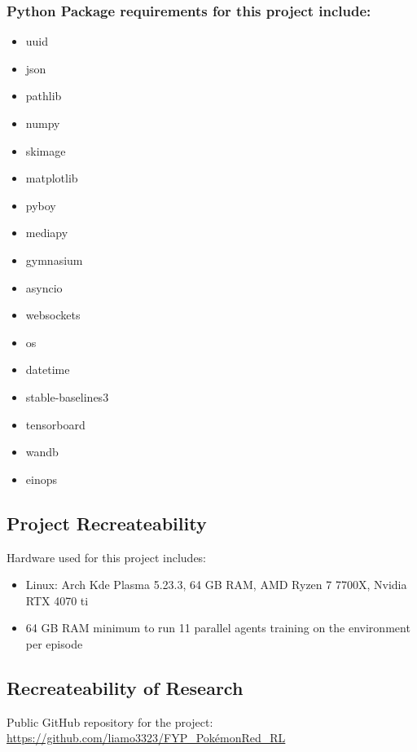 \subsubsection*{Python Package requirements for this project include: }

\begin{multicols}{2}
\begin{itemize}
    \item uuid
    \item json
    \item pathlib
    \item numpy
    \item skimage
    \item matplotlib
    \item pyboy
    \item mediapy
    \item gymnasium
    \item asyncio
    \item websockets
    \item os
    \item datetime
    \item stable-baselines3
    \item tensorboard
    \item wandb
    \item einops
\end{itemize}
\end{multicols}

\subsection{Project Recreateability}\label{subsec:Hardware}

Hardware used for this project includes:
\begin{itemize}
    \item Linux: Arch Kde Plasma 5.23.3, 64 GB RAM, AMD Ryzen 7 7700X, Nvidia RTX 4070 ti
    \item 64 GB RAM minimum to run 11 parallel agents training on the environment per episode

\end{itemize}

\subsection{Recreateability of Research}

Public GitHub repository for the project: \url{https://github.com/liamo3323/FYP_PokémonRed_RL}

